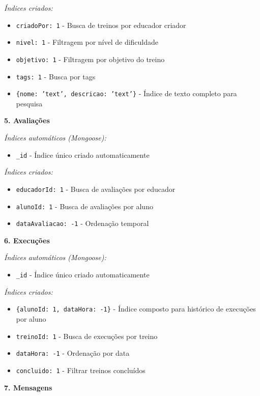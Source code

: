 \documentclass[12pt,a4paper]{article}
\begin{document}
\textit{Índices criados:}
\begin{itemize}
    \item \texttt{criadoPor: 1} - Busca de treinos por educador criador
    \item \texttt{nivel: 1} - Filtragem por nível de dificuldade
    \item \texttt{objetivo: 1} - Filtragem por objetivo do treino
    \item \texttt{tags: 1} - Busca por tags
    \item \texttt{\{nome: 'text', descricao: 'text'\}} - Índice de texto completo para pesquisa
\end{itemize}

\textbf{5. Avaliações}

\textit{Índices automáticos (Mongoose):}
\begin{itemize}
    \item \texttt{\_id} - Índice único criado automaticamente
\end{itemize}

\textit{Índices criados:}
\begin{itemize}
    \item \texttt{educadorId: 1} - Busca de avaliações por educador
    \item \texttt{alunoId: 1} - Busca de avaliações por aluno
    \item \texttt{dataAvaliacao: -1} - Ordenação temporal
\end{itemize}

\textbf{6. Execuções}

\textit{Índices automáticos (Mongoose):}
\begin{itemize}
    \item \texttt{\_id} - Índice único criado automaticamente
\end{itemize}

\textit{Índices criados:}
\begin{itemize}
    \item \texttt{\{alunoId: 1, dataHora: -1\}} - Índice composto para histórico de execuções por aluno
    \item \texttt{treinoId: 1} - Busca de execuções por treino
    \item \texttt{dataHora: -1} - Ordenação por data
    \item \texttt{concluido: 1} - Filtrar treinos concluídos
\end{itemize}

\textbf{7. Mensagens}
\end{document}
